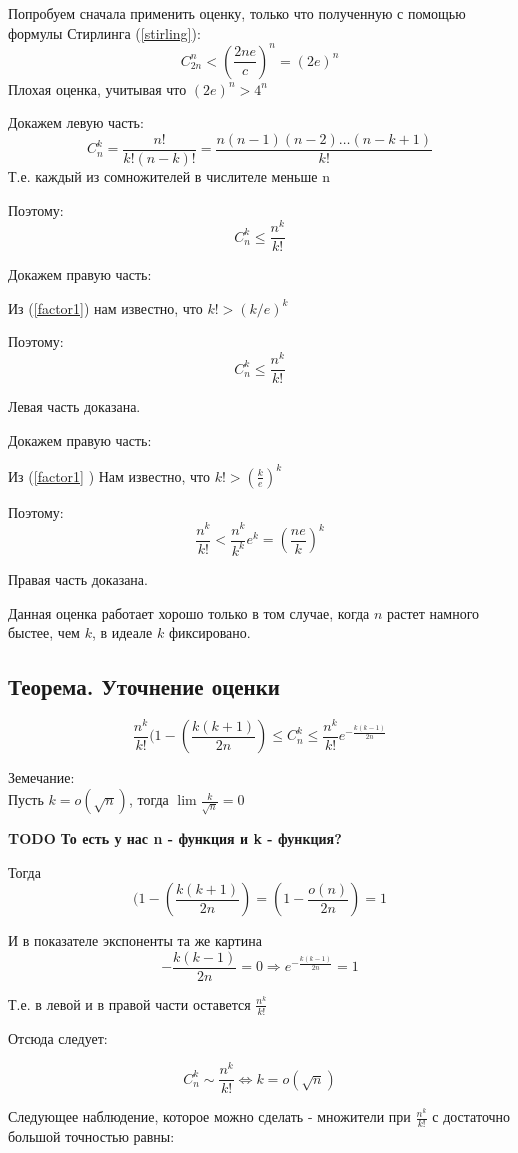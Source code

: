 Попробуем сначала применить оценку, только что полученную с помощью формулы Стирлинга (\ref{stirling}):
$$
C_{2n}^{n} < \left( \frac{2ne}{c} \right)^n = (2e)^{n}
$$
Плохая оценка, учитывая что $ (2e)^{n} > 4^{n} $

Докажем левую часть:
$$
C_{n}^{k} = \frac{n!}{k!(n-k)!} = \frac{n(n-1)(n-2) \ldots (n-k+1)}{k!}
$$
Т.е. каждый из сомножителей в числителе меньше n

Поэтому:
$$
C_{n}^{k} \le \frac{n^k}{k!}
$$

Докажем правую часть:

Из (\ref{factor1}) нам известно, что $k! > (k/e)^k$

Поэтому:
$$
C_{n}^{k} \le \frac{n^k}{k!}
$$

Левая часть доказана.

Докажем правую часть:

Из (\ref{factor1} ) Нам известно, что $k! > \left( \frac{k}{e} \right)^k $

Поэтому:
$$
\frac{n^k}{k!} <  \frac{n^k}{k^k} e^k = \left( \frac{ne}{k} \right)^k
$$

Правая часть доказана.

Данная оценка работает хорошо только в том случае, когда $ n $ растет намного быстее, чем $ k $,
в идеале $ k $ фиксировано.

\subsection{Теорема. Уточнение оценки}

$$
\frac{n^k}{k!}(1 - \left (\frac{k(k+1)}{2n} \right)
\le C_n^k
\le \frac{n^{k}}{k!}   e^{-\frac{k(k-1)}{2n}}
$$


Земечание: \\
Пусть $k = o(\sqrt{n}) $, тогда $ \lim \frac{k}{\sqrt{n}} = 0 $

\textbf{TODO То есть у нас n - функция и k - функция?}

Тогда 
$$
(1 - \left (\frac{k(k+1)}{2n} \right) = (1 - \frac{o(n)}{2n}) = 1
$$

И в показателе экспоненты та же картина
$$
-\frac{k(k-1)}{2n} = 0 \Rightarrow e^{-\frac{k(k-1)}{2n}} = 1
$$

Т.е. в левой и в правой части оставется $ \frac{n^k}{k!} $

Отсюда следует:

$$
C_n^k \sim \frac{n^k}{k!} \Leftrightarrow k = o(\sqrt{n}) 
$$

Следующее наблюдение, которое можно сделать - множители при $ \frac{n^k}{k!} $
с достаточно большой точностью равны:

